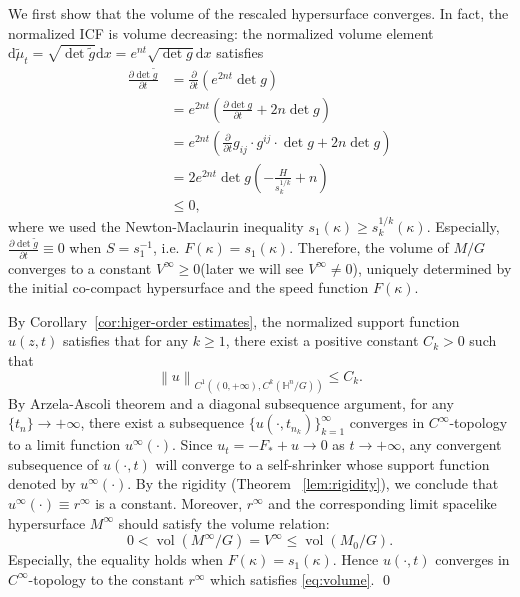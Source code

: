 \documentclass[10pt,a4paper]{amsart}
\newcommand{\norm}[1]{\left\lVert{#1}\right\rVert}
\newcommand{\dd}{\ensuremath{\text{d}}}
\renewcommand{\H}{{\mathbb{H}}}
\newcommand{\pd}[2]{\frac{\partial {#1}}{\partial {#2}}}
\numberwithin{equation}{section}
\begin{document}
We first show that the volume of the rescaled hypersurface converges. In fact, the normalized ICF is volume decreasing: the normalized volume element \(\dd \tilde{\mu}_t = \sqrt{\det \tilde{g}}\dd x = e^{nt} \sqrt{\det g}\dd x\) satisfies 
\[ \begin{aligned}
    \pd{\det \tilde{g}}{t} &= \pd{}{t}\left(e^{2nt} \det g \right) \\
    &= e^{2nt}\left( \pd{\det g}{t} + 2n\det g \right) \\
    &= e^{2nt}\left( \pd{}{t}g_{ij} \cdot g^{ij} \cdot \det g + 2n\det g \right) \\
    &= 2e^{2nt}\det g \left( -\frac{H}{s_k^{1/k}} + n \right) \\
    &\leq 0,
\end{aligned}  \]
where we used the Newton-Maclaurin inequality \( s_1(\kappa)\geq s_k^{1/k}(\kappa) \). Especially, \(\pd{\det \tilde{g}}{t} \equiv 0\) when \(S = s_1^{-1}\), i.e. \(F(\kappa) = s_1(\kappa)\). Therefore, the volume of \(M / G\) converges to a constant \(V^\infty \geq 0\)(later we will see \(V^\infty \neq 0\)), uniquely determined by the initial co-compact hypersurface and the speed function \(F(\kappa)\).  
\par By Corollary~\ref{cor:higer-order estimates}, the normalized support function \(u(z,t)\) satisfies that for any \(k \geq 1\), there exist a positive constant \(C_k>0\) such that 
\[ \norm{u}_{C^1\left( (0,+\infty),C^k(\H^n / G) \right)} \leq C_k.\]
By Arzela-Ascoli theorem and a diagonal subsequence argument, for any \(\{t_n\}\to +\infty\), there exist a subsequence \(\{u(\cdot,t_{n_k})\}_{k=1}^{\infty}\) converges in \(C^{\infty}\)-topology to a limit function \(u^{\infty}(\cdot)\). Since \(u_t = -F_* + u \to 0\) as \(t\to +\infty\), any convergent subsequence of \(u(\cdot,t)\) will converge to a self-shrinker whose support function denoted by \(u^{\infty}(\cdot)\). By the rigidity (Theorem ~\ref{lem:rigidity}), we conclude that \(u^{\infty}(\cdot) \equiv r^\infty\) is a constant. Moreover, \(r^{\infty}\) and the corresponding limit spacelike hypersurface \(M^{\infty}\) should satisfy the volume relation: 
\begin{equation}\label{eq:volume}
0 < \operatorname{vol} (M^{\infty}/G) = V^{\infty} \leq \operatorname{vol} (M_0/G).
\end{equation}
Especially, the equality holds when \(F(\kappa) = s_1(\kappa)\). Hence \(u(\cdot,t)\) converges in \(C^{\infty}\)-topology to the constant \(r^{\infty}\) which satisfies \eqref{eq:volume}. \qed 
\end{document}
